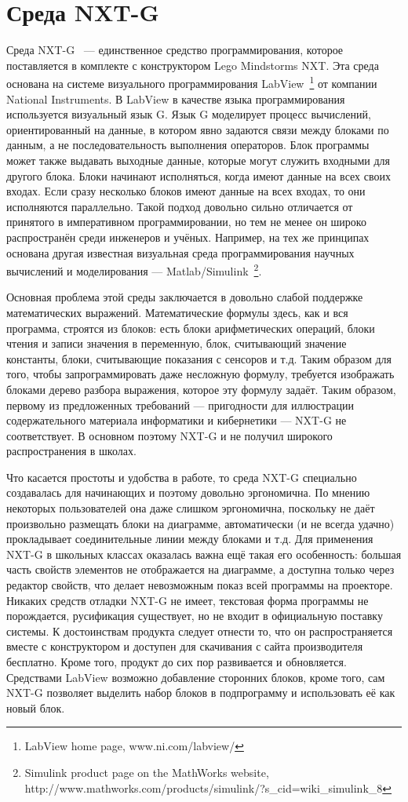 \documentclass[a4paper]{article}
\begin{document}
\section{Среда NXT-G}
Среда NXT-G~\cite{nxtG} --- единственное средство программирования, которое поставляется в комплекте с конструктором Lego Mindstorms NXT. Эта среда основана  на системе визуального программирования LabView~\footnote{LabView home page, www.ni.com/labview/} от компании National Instruments. В LabView в качестве языка программирования используется визуальный язык G. Язык G моделирует процесс вычислений, ориентированный на данные, в котором явно задаются связи между блоками по данным, а не последовательность выполнения операторов. Блок программы может также выдавать выходные данные, которые могут служить входными для другого блока. Блоки начинают исполняться, когда имеют данные на всех своих входах. Если сразу несколько блоков имеют данные на всех входах, то они исполняются параллельно. Такой подход довольно сильно отличается от принятого в императивном программировании, но тем не менее он широко распространён среди инженеров и учёных. Например, на тех же принципах основана другая известная визуальная среда программирования научных вычислений и моделирования --- Matlab/Simulink~\footnote{Simulink product page on the MathWorks website, http://www.mathworks.com/products/simulink/?s\_cid=wiki\_simulink\_8}.

Основная проблема этой среды заключается в довольно слабой поддержке математических выражений. Математические формулы здесь, как и вся программа, строятся из блоков: есть блоки арифметических операций, блоки чтения и записи значения в переменную, блок, считывающий значение константы, блоки, считывающие показания с сенсоров и т.д. Таким образом для того, чтобы запрограммировать даже несложную формулу, требуется изображать блоками дерево разбора выражения, которое эту формулу задаёт. Таким образом, первому из предложенных требований --- пригодности для иллюстрации содержательного материала информатики и кибернетики --- NXT-G не соответствует. В основном поэтому NXT-G и не получил широкого распространения в школах.

Что касается простоты и удобства в работе, то среда NXT-G специально создавалась для начинающих и поэтому довольно эргономична. По мнению некоторых пользователей она даже слишком эргономична, поскольку не даёт произвольно размещать блоки на диаграмме, автоматически (и не всегда удачно) прокладывает соединительные линии между блоками и т.д. Для применения NXT-G в школьных классах оказалась важна ещё такая его особенность: большая часть свойств элементов не отображается на диаграмме, а доступна только через редактор свойств, что делает невозможным показ всей программы на проекторе. Никаких средств отладки NXT-G не имеет, текстовая форма программы не порождается, русификация существует, но не входит в официальную поставку системы. К достоинствам  продукта следует отнести то, что он распространяется вместе с конструктором и доступен для скачивания с сайта производителя бесплатно. Кроме того, продукт до сих пор развивается и обновляется. Средствами LabView возможно добавление сторонних блоков, кроме того, сам NXT-G позволяет выделить набор блоков в подпрограмму и использовать её как новый блок.
\end{document}

